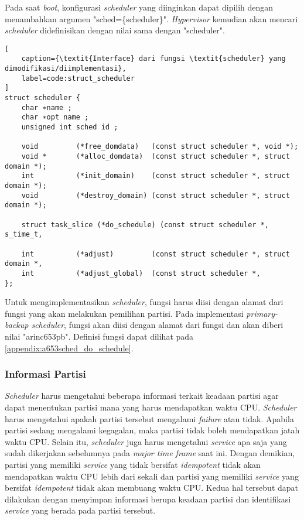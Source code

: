 Pada saat \textit{boot}, konfigurasi \textit{scheduler} yang diinginkan dapat dipilih dengan
menambahkan argumen "sched=\{scheduler\}". \textit{Hypervisor} kemudian akan mencari
\textit{scheduler} didefinisikan dengan nilai  sama dengan "scheduler".

\begin{lstlisting}[
	caption={\textit{Interface} dari fungsi \textit{scheduler} yang dimodifikasi/diimplementasi},
	label=code:struct_scheduler
]
struct scheduler {
    char ∗name ;
    char ∗opt name ;
    unsigned int sched id ;

    void         (*free_domdata)   (const struct scheduler *, void *);
    void *       (*alloc_domdata)  (const struct scheduler *, struct domain *);
    int          (*init_domain)    (const struct scheduler *, struct domain *);
    void         (*destroy_domain) (const struct scheduler *, struct domain *);

    struct task_slice (*do_schedule) (const struct scheduler *, s_time_t,

    int          (*adjust)         (const struct scheduler *, struct domain *,
    int          (*adjust_global)  (const struct scheduler *,
};
\end{lstlisting}

Untuk mengimplementasikan \textit{scheduler}, fungsi  harus diisi dengan
alamat dari fungsi yang akan melakukan pemilihan partisi. Pada implementasi
\textit{primary-backup scheduler}, fungsi  akan diisi dengan alamat dari
fungsi  dan  akan diberi nilai "arinc653pb".
Definisi fungsi  dapat dilihat pada
\autoref{appendix:a653sched_do_schedule}.

\subsubsection{Informasi Partisi}

\textit{Scheduler} harus mengetahui beberapa informasi terkait keadaan partisi agar dapat
menentukan partisi mana yang harus mendapatkan waktu CPU.  \textit{Scheduler} harus mengetahui
apakah partisi tersebut mengalami \textit{failure} atau tidak. Apabila partisi sedang mengalami
kegagalan, maka partisi tidak boleh mendapatkan jatah waktu CPU. Selain itu, \textit{scheduler}
juga harus mengetahui \textit{service} apa saja yang sudah dikerjakan sebelumnya pada
\textit{major time frame} saat ini. Dengan demikian, partisi yang memiliki \textit{service} yang
tidak bersifat \textit{idempotent} tidak akan mendapatkan waktu CPU lebih dari sekali dan
partisi yang memiliki \textit{service} yang bersifat \textit{idempotent} tidak akan membuang
waktu CPU. Kedua hal tersebut dapat dilakukan dengan menyimpan informasi berupa keadaan partisi
dan identifikasi \textit{service} yang berada pada partisi tersebut.

